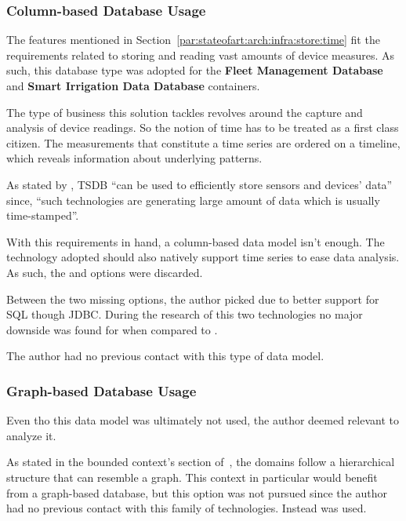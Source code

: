 \subsubsection{Column-based Database Usage}
\label{subsubsec:implementation:decisions:database:time}

The features mentioned in Section~\ref{par:stateofart:arch:infra:store:time} fit the requirements related to storing and reading vast amounts of device measures. As such, this database type was adopted for the \textbf{Fleet Management Database} and \textbf{Smart Irrigation Data Database} containers.

The type of business this solution tackles revolves around the capture and analysis of device readings. So the notion of time has to be treated as a first class citizen. The measurements that constitute a time series are ordered on a timeline, which reveals information about underlying patterns.

As stated by \cite{naqvi2017time}, \gls{TSDB} ``can be used to efficiently store sensors and devices' data'' since, ``such technologies are generating large amount of data which is usually time-stamped''.

With this requirements in hand, a column-based data model isn't enough. The technology adopted should also natively support time series to ease data analysis. As such, the  and  options were discarded.

Between the two missing options, the author picked  due to better support for \gls{SQL} though \gls{JDBC}. During the research of this two technologies no major downside was found for  when compared to .

The author had no previous contact with this type of data model.

\subsubsection{Graph-based Database Usage}
\label{subsubsec:implementation:decisions:database:identity}

Even tho this data model was ultimately not used, the author deemed relevant to analyze it.

As stated in the bounded context's section of~, the domains follow a hierarchical structure that can resemble a graph. This context in particular would benefit from a  graph-based database, but this option was not pursued since the author had no previous contact with this family of technologies. Instead  was used.

